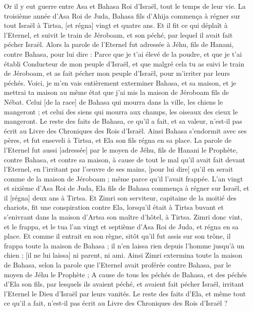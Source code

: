 \begin{multicols}{2}
Or il y eut guerre entre Asa et Bahasa Roi d'Israël, tout le temps de leur vie.
La troisième année d'Asa Roi de Juda, Bahasa fils d'Ahija commença à régner sur tout Israël à Tirtsa, [et régna] vingt et quatre ans.
Et il fit ce qui déplaît à l'Eternel, et suivit le train de Jéroboam, et son péché, par lequel il avait fait pécher Israël.
\VerseOne{}Alors la parole de l'Eternel fut adressée à Jéhu, fils de Hanani, contre Bahasa, pour lui dire :
Parce que je t'ai élevé de la poudre, et que je t'ai établi Conducteur de mon peuple d'Israël, et que malgré cela tu as suivi le train de Jéroboam, et as fait pécher mon peuple d'Israël, pour m'irriter par leurs péchés.
Voici, je m'en vais entièrement exterminer Bahasa, et sa maison, et je mettrai ta maison au même état que j'ai mis la maison de Jéroboam fils de Nébat.
Celui [de la race] de Bahasa qui mourra dans la ville, les chiens le mangeront ; et celui des siens qui mourra aux champs, les oiseaux des cieux le mangeront.
Le reste des faits de Bahasa, ce qu'il a fait, et sa valeur, n'est-il pas écrit au Livre des Chroniques des Rois d'Israël.
Ainsi Bahasa s'endormit avec ses pères, et fut enseveli à Tirtsa, et Ela son fils régna en sa place.
La parole de l'Eternel fut aussi [adressée] par le moyen de Jéhu, fils de Hanani le Prophète, contre Bahasa, et contre sa maison, à cause de tout le mal qu'il avait fait devant l'Eternel, en l'irritant par l'œuvre de ses mains, [pour lui dire] qu'il en serait comme de la maison de Jéroboam ; même parce qu'il l'avait frappée.
L'an vingt et sixième d'Asa Roi de Juda, Ela fils de Bahasa commença à régner sur Israël, et il [régna] deux ans à Tirtsa.
Et Zimri son serviteur, capitaine de la moitié des chariots, fit une conspiration contre Ela, lorsqu'il était à Tirtsa buvant et s'enivrant dans la maison d'Artsa son maître d'hôtel, à Tirtsa.
Zimri donc vint, et le frappa, et le tua l'an vingt et septième d'Asa Roi de Juda, et régna en sa place.
Et comme il entrait en son règne, sitôt qu'il fut assis sur son trône, il frappa toute la maison de Bahasa ; il n'en laissa rien depuis l'homme jusqu'à un chien ; [il ne lui laissa] ni parent, ni ami.
Ainsi Zimri extermina toute la maison de Bahasa, selon la parole que l'Eternel avait proférée contre Bahasa, par le moyen de Jéhu le Prophète ;
A cause de tous les péchés de Bahasa, et des péchés d'Ela son fils, par lesquels ils avaient péché, et avaient fait pécher Israël, irritant l'Eternel le Dieu d'Israël par leurs vanités.
Le reste des faits d'Ela, et même tout ce qu'il a fait, n'est-il pas écrit au Livre des Chroniques des Rois d'Israël ?

\end{multicols}
